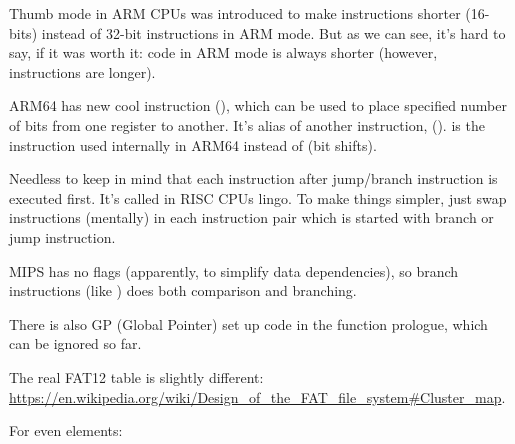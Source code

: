 
Thumb mode in ARM CPUs was introduced to make instructions shorter (16-bits) instead of 32-bit instructions in ARM mode.
But as we can see, it's hard to say, if it was worth it: code in ARM mode is always shorter (however, instructions are longer).





ARM64 has new cool instruction  (), 
which can be used to place specified number of bits from one register to another.
It's alias of another instruction,  ().
 is the instruction used internally in ARM64 instead of  (bit shifts).





Needless to keep in mind that each instruction after jump/branch instruction is executed first.
It's called  in RISC CPUs lingo.
To make things simpler, just swap instructions (mentally) in each instruction pair which is started with branch or jump instruction.

MIPS has no flags (apparently, to simplify data dependencies), so branch instructions (like ) does both comparison and branching.

There is also GP (Global Pointer) set up code in the function prologue, which can be ignored so far.








The real FAT12 table is slightly different: \url{https://en.wikipedia.org/wiki/Design_of_the_FAT_file_system\#Cluster_map}.

For even elements:

